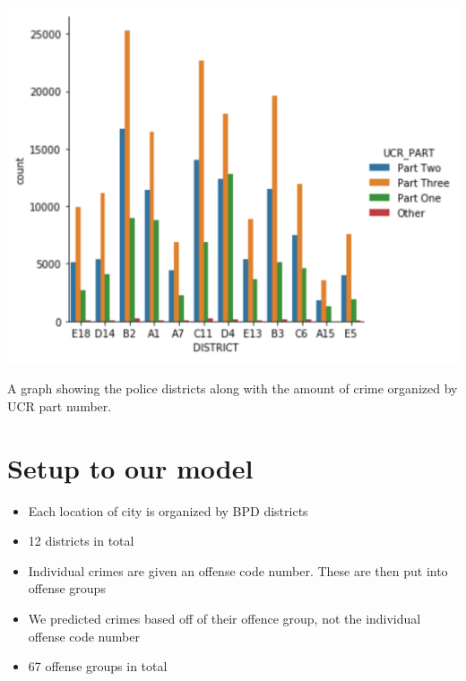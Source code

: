 \documentclass[a0,landscape]{a0poster}
\let\Section=\section
\def\section{\setcounter{equation}{0}\Section}
\newcommand{\1}{\bold{1}}
\begin{document}
\begin{multicols}{3}
\begin{center}
\centering
\includegraphics[scale = 2]{graph4paper1.png}

    A graph showing the police districts along with the amount of crime organized by UCR part number.
\end{center}
\section{Setup to our model}
\begin{itemize}
    \item Each location of city is organized by BPD districts
    \item 12 districts in total 
    \item Individual crimes are given an offense code number. These are then put into offense groups
    \item We predicted crimes based off of their offence group, not the individual offense code number
    \item 67 offense groups in total
\end{itemize}


\end{multicols}
\end{document}
